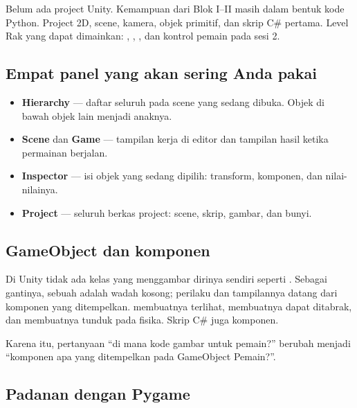 
\petasesi
  {Belum ada project Unity. Kemampuan dari Blok I--II masih dalam bentuk
   kode Python.}
  {Project 2D, scene, kamera, objek primitif, dan skrip C\# pertama.}
  {Level Rak yang dapat dimainkan: , ,
   , dan kontrol pemain pada sesi 2.}


\subsection*{Empat panel yang akan sering Anda pakai}

\begin{itemize}[leftmargin=1.4em, itemsep=0.3em]
  \item \textbf{Hierarchy} --- daftar seluruh  pada scene
        yang sedang dibuka. Objek di bawah objek lain menjadi anaknya.
  \item \textbf{Scene} dan \textbf{Game} --- tampilan kerja di editor dan
        tampilan hasil ketika permainan berjalan.
  \item \textbf{Inspector} --- isi objek yang sedang dipilih: transform,
        komponen, dan nilai-nilainya.
  \item \textbf{Project} --- seluruh berkas project: scene, skrip, gambar,
        dan bunyi.
\end{itemize}

\subsection*{GameObject dan komponen}

Di Unity tidak ada kelas yang menggambar dirinya sendiri seperti
. Sebagai gantinya, sebuah 
adalah wadah kosong; perilaku dan tampilannya datang dari komponen yang
ditempelkan.  membuatnya terlihat,
 membuatnya dapat ditabrak, dan  membuatnya
tunduk pada fisika. Skrip C\# juga komponen.

Karena itu, pertanyaan ``di mana kode gambar untuk pemain?'' berubah menjadi
``komponen apa yang ditempelkan pada GameObject Pemain?''.

\subsection*{Padanan dengan Pygame}

